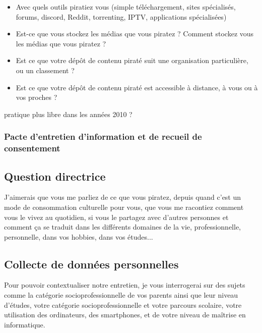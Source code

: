 \begin{itemize}
             \item Avec quels outils piratiez vous (simple téléchargement, sites spécialisés, forums, discord, Reddit, torrenting, IPTV,  applications spécialisées)

             \item Est-ce que vous stockez les médias que vous piratez ? Comment stockez vous les médias que vous piratez ?

             \item Est ce que votre dépôt de contenu piraté suit une organisation particulière, ou un classement ?

             \item Est ce que votre dépôt de contenu piraté est accessible à distance, à vous ou à vos proches ?
             
         \end{itemize}

         pratique plus libre dans les années 2010 ?

\newpage

\subsubsection*{Pacte d'entretien d'information et de recueil de consentement}
    \hrulefill

    \subsection*{Question directrice}

    \guillemetleft J'aimerais que vous me parliez de ce que vous piratez, depuis quand c'est un mode de consommation culturelle pour vous, que vous me racontiez comment vous le vivez au quotidien, si vous le partagez avec d'autres personnes et comment ça se traduit dans les différents domaines de la vie, professionnelle, personnelle, dans vos hobbies, dans vos études...\guillemetright

    \subsection*{Collecte de données personnelles}

    Pour pouvoir contextualiser notre entretien, je vous interrogerai sur des sujets comme la catégorie socioprofessionnelle de vos parents ainsi que leur niveau d'études, votre catégorie socioprofessionnelle et votre parcours scolaire, votre utilisation des ordinateurs, des smartphones, et de votre niveau de maîtrise en informatique.\\

